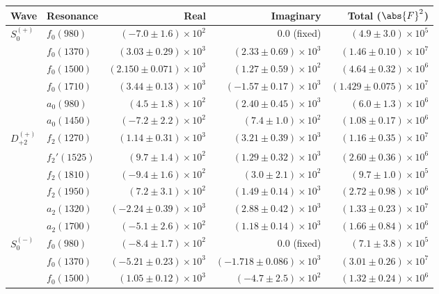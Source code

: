 \begin{table}[ht]
    \begin{center}
        \begin{tabular}{llrrr}\toprule
        Wave & Resonance & Real & Imaginary & Total ($\abs{F}^2$) \\\midrule
$S_{0}^{(+)}$ & $f_{0}(980)$ & $(-7.0 \pm 1.6) \times 10^{2}$ & $0.0$ (fixed) & $(4.9 \pm 3.0) \times 10^{5}$ \\
 & $f_{0}(1370)$ & $(3.03 \pm 0.29) \times 10^{3}$ & $(2.33 \pm 0.69) \times 10^{3}$ & $(1.46 \pm 0.10) \times 10^{7}$ \\
 & $f_{0}(1500)$ & $(2.150 \pm 0.071) \times 10^{3}$ & $(1.27 \pm 0.59) \times 10^{2}$ & $(4.64 \pm 0.32) \times 10^{6}$ \\
 & $f_{0}(1710)$ & $(3.44 \pm 0.13) \times 10^{3}$ & $(-1.57 \pm 0.17) \times 10^{3}$ & $(1.429 \pm 0.075) \times 10^{7}$ \\
 & $a_{0}(980)$ & $(4.5 \pm 1.8) \times 10^{2}$ & $(2.40 \pm 0.45) \times 10^{3}$ & $(6.0 \pm 1.3) \times 10^{6}$ \\
 & $a_{0}(1450)$ & $(-7.2 \pm 2.2) \times 10^{2}$ & $(7.4 \pm 1.0) \times 10^{2}$ & $(1.08 \pm 0.17) \times 10^{6}$ \\
$D_{+2}^{(+)}$ & $f_{2}(1270)$ & $(1.14 \pm 0.31) \times 10^{3}$ & $(3.21 \pm 0.39) \times 10^{3}$ & $(1.16 \pm 0.35) \times 10^{7}$ \\
 & $f_{2}'(1525)$ & $(9.7 \pm 1.4) \times 10^{2}$ & $(1.29 \pm 0.32) \times 10^{3}$ & $(2.60 \pm 0.36) \times 10^{6}$ \\
 & $f_{2}(1810)$ & $(-9.4 \pm 1.6) \times 10^{2}$ & $(3.0 \pm 2.1) \times 10^{2}$ & $(9.7 \pm 1.0) \times 10^{5}$ \\
 & $f_{2}(1950)$ & $(7.2 \pm 3.1) \times 10^{2}$ & $(1.49 \pm 0.14) \times 10^{3}$ & $(2.72 \pm 0.98) \times 10^{6}$ \\
 & $a_{2}(1320)$ & $(-2.24 \pm 0.39) \times 10^{3}$ & $(2.88 \pm 0.42) \times 10^{3}$ & $(1.33 \pm 0.23) \times 10^{7}$ \\
 & $a_{2}(1700)$ & $(-5.1 \pm 2.6) \times 10^{2}$ & $(1.18 \pm 0.14) \times 10^{3}$ & $(1.66 \pm 0.84) \times 10^{6}$ \\
$S_{0}^{(-)}$ & $f_{0}(980)$ & $(-8.4 \pm 1.7) \times 10^{2}$ & $0.0$ (fixed) & $(7.1 \pm 3.8) \times 10^{5}$ \\
 & $f_{0}(1370)$ & $(-5.21 \pm 0.23) \times 10^{3}$ & $(-1.718 \pm 0.086) \times 10^{3}$ & $(3.01 \pm 0.26) \times 10^{7}$ \\
 & $f_{0}(1500)$ & $(1.05 \pm 0.12) \times 10^{3}$ & $(-4.7 \pm 2.5) \times 10^{2}$ & $(1.32 \pm 0.24) \times 10^{6}$ \\

\end{tabular}
\end{center}
\end{table}

